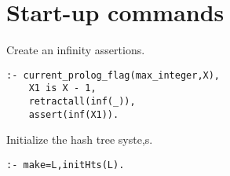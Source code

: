 \section{ Start-up commands
}
Create an infinity assertions.
\begin{Verbatim}
:- current_prolog_flag(max_integer,X), 
    X1 is X - 1, 
    retractall(inf(_)),
    assert(inf(X1)).
\end{Verbatim}
Initialize the hash tree syste,s.
\begin{Verbatim}
:- make=L,initHts(L).
\end{Verbatim}
